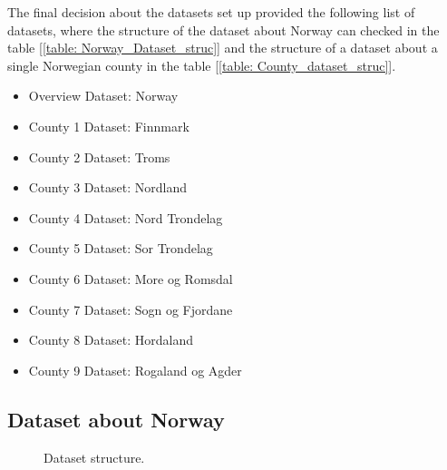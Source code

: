 The final decision about the datasets set up provided the following list of datasets, where the structure of the dataset about Norway can checked in the table [\ref{table: Norway_Dataset_struc}] and the structure of a dataset about a single Norwegian county in the table [\ref{table: County_dataset_struc}].
\vspace{-2mm}
 \setlength{\itemsep}{-5pt}
\begin{itemize}
\item Overview Dataset: Norway
\vspace{-2mm}
\item County 1 Dataset: Finnmark
\vspace{-2mm}
\item County 2 Dataset: Troms
\vspace{-2mm}
\item County 3 Dataset: Nordland
\vspace{-2mm}
\item County 4 Dataset: Nord Trondelag
\vspace{-2mm}
\item County 5 Dataset: Sor Trondelag
\vspace{-2mm}
\item County 6 Dataset: More og Romsdal
\vspace{-2mm}
\item County 7 Dataset: Sogn og Fjordane
\vspace{-2mm}
\item County 8 Dataset: Hordaland
\vspace{-2mm}
\item County 9 Dataset: Rogaland og Agder
\end{itemize}

\newpage

\subsection{Dataset about Norway}

\begin{figure}[H]
    \caption{Dataset structure.}
\end{figure}

